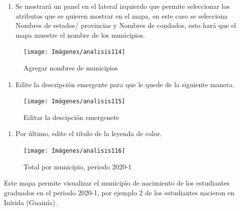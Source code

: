 \documentclass[
]{book}
\providecommand{\tightlist}{%
  \setlength{\itemsep}{0pt}\setlength{\parskip}{0pt}}
\begin{document}
\begin{enumerate}
\def\labelenumi{\arabic{enumi}.}
\setcounter{enumi}{6}
\tightlist
\item
  Se mostrará un panel en el lateral izquierdo que permite seleccionar los atributos que se quieren mostrar en el mapa, en este caso se selecciona Nombres de estados/ provincias y Nombres de condados, esto hará que el mapa muestre el nombre de los municipios.
\end{enumerate}

\begin{figure}

{\centering \texttt{[image: Imágenes/analisis114]} 

}

\caption{Agregar nombres de municipios}\label{fig:paso7mapeomunicipios-fig}
\end{figure}

\begin{enumerate}
\def\labelenumi{\arabic{enumi}.}
\setcounter{enumi}{7}
\tightlist
\item
  Edite la descripción emergente para que le quede de la siguiente manera.
\end{enumerate}

\begin{figure}

{\centering \texttt{[image: Imágenes/analisis115]} 

}

\caption{Editar la descipción emergenete}\label{fig:paso8mapeomunicipios-fig}
\end{figure}

\begin{enumerate}
\def\labelenumi{\arabic{enumi}.}
\setcounter{enumi}{8}
\tightlist
\item
  Por último, edite el título de la leyenda de color.
\end{enumerate}

\begin{figure}

{\centering \texttt{[image: Imágenes/analisis116]} 

}

\caption{Total por municipio, periodo 2020-1}\label{fig:mapeomunicipios-fig}
\end{figure}

Este mapa permite visualizar el municipio de nacimiento de los estudiantes graduados en el periodo 2020-1, por ejemplo 2 de los estudiantes nacieron en Inírida (Guainía).
\end{document}
